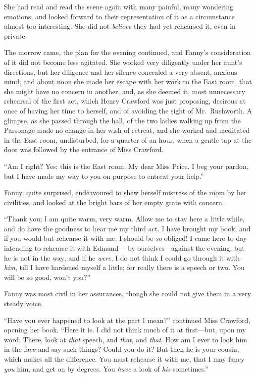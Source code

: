 She had read and read the scene again with many painful,
many wondering emotions, and looked forward to their
representation of it as a circumstance almost too interesting.
She did not \emph{believe} they had yet rehearsed it,
even in private.

The morrow came, the plan for the evening continued,
and Fanny's consideration of it did not become less agitated.
She worked very diligently under her aunt's directions,
but her diligence and her silence concealed a very absent,
anxious mind; and about noon she made her escape with her
work to the East room, that she might have no concern
in another, and, as she deemed it, most unnecessary
rehearsal of the first act, which Henry Crawford was
just proposing, desirous at once of having her time
to herself, and of avoiding the sight of Mr.\ Rushworth.
A glimpse, as she passed through the hall, of the two
ladies walking up from the Parsonage made no change
in her wish of retreat, and she worked and meditated
in the East room, undisturbed, for a quarter of an hour,
when a gentle tap at the door was followed by the entrance
of Miss Crawford.

``Am I right?  Yes; this is the East room.  My dear
Miss Price, I beg your pardon, but I have made my way
to you on purpose to entreat your help.''

Fanny, quite surprised, endeavoured to shew herself
mistress of the room by her civilities, and looked
at the bright bars of her empty grate with concern.

``Thank you; I am quite warm, very warm.  Allow me to stay
here a little while, and do have the goodness to hear me
my third act.  I have brought my book, and if you would
but rehearse it with me, I should be \emph{so} obliged!
I came here to-day intending to rehearse it with Edmund---%
by ourselves---against the evening, but he is not in the way;
and if he \emph{were}, I do not think I could go through
it with \emph{him}, till I have hardened myself a little;
for really there is a speech or two.  You will be so good,
won't you?''

Fanny was most civil in her assurances, though she could
not give them in a very steady voice.

``Have you ever happened to look at the part I mean?''
continued Miss Crawford, opening her book.  ``Here it is.
I did not think much of it at first---but, upon my word.
There, look at \emph{that} speech, and \emph{that}, and \emph{that}.
How am I ever to look him in the face and say such things?
Could you do it?  But then he is your cousin, which makes
all the difference.  You must rehearse it with me, that I
may fancy \emph{you} him, and get on by degrees.  You \emph{have} a look
of \emph{his} sometimes.''

